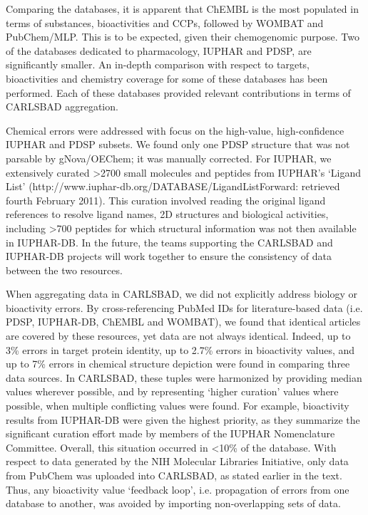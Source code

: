 Comparing the databases, it is apparent that ChEMBL is the most populated in terms of substances, bioactivities and CCPs, followed by WOMBAT and PubChem/MLP. This is to be expected, given their chemogenomic purpose. Two of the databases dedicated to pharmacology, IUPHAR and PDSP, are significantly smaller. An in-depth comparison with respect to targets, bioactivities and chemistry coverage for some of these databases has been performed\cite{Tiikkainen2012-cw}. Each of these databases provided relevant contributions in terms of CARLSBAD aggregation.

Chemical errors were addressed with focus on the high-value, high-confidence IUPHAR and PDSP subsets. We found only one PDSP structure that was not parsable by gNova/OEChem; it was manually corrected. For IUPHAR, we extensively curated \textgreater 2700 small molecules and peptides from IUPHAR’s ‘Ligand List’ (http://www.iuphar-db.org/DATABASE/LigandListForward: retrieved fourth February 2011). This curation involved reading the original ligand references to resolve ligand names, 2D structures and biological activities, including \textgreater700 peptides for which structural information was not then available in IUPHAR-DB\cite{Harding2018-ut}. In the future, the teams supporting the CARLSBAD and IUPHAR-DB projects will work together to ensure the consistency of data between the two resources.

When aggregating data in CARLSBAD, we did not explicitly address biology or bioactivity errors. By cross-referencing PubMed IDs for literature-based data (i.e. PDSP, IUPHAR-DB, ChEMBL and WOMBAT), we found that identical articles are covered by these resources, yet data are not always identical. Indeed, up to 3\% errors in target protein identity, up to 2.7\% errors in bioactivity values, and up to 7\% errors in chemical structure depiction were found in comparing three data sources. In CARLSBAD, these tuples were harmonized by providing median values wherever possible, and by representing ‘higher curation’ values where possible, when multiple conflicting values were found. For example, bioactivity results from IUPHAR-DB were given the highest priority, as they summarize the significant curation effort made by members of the IUPHAR Nomenclature Committee. Overall, this situation occurred in \textless 10\% of the database. With respect to data generated by the NIH Molecular Libraries Initiative\cite{Austin2004-qc}, only data from PubChem was uploaded into CARLSBAD, as stated earlier in the text. Thus, any bioactivity value ‘feedback loop’, i.e. propagation of errors from one database to another, was avoided by importing non-overlapping sets of data.

